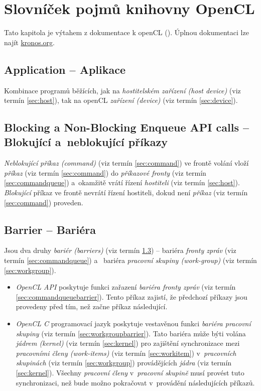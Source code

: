 \chapter{Slovníček pojmů knihovny OpenCL}

Tato kapitola je výtahem z dokumentace k openCL (\cite{opencl}).
Úplnou dokumentaci lze najít \url{kronos.org}.

\section{Application -- Aplikace}
\label{sec:application}

Kombinace programů běžících, jak na \emph{hostitelském zařízení (host device)} (viz termín \ref{sec:host}), tak na openCL \emph{zařízení (device)}  (viz termín \ref{sec:device}).

\section{Blocking a Non-Blocking Enqueue API calls -- Blokující a~neblokující příkazy }
\label{sec:blockunblocapicall}

\emph{Neblokující} \emph{příkaz (command)} (viz termín \ref{sec:command}) ve frontě volání vloží \emph{příkaz} (viz termín \ref{sec:command}) do
\emph{příkazové fronty} (viz termín \ref{sec:commandqueue}) a~okamžitě vrátí řízení \emph{hostiteli} (viz termín \ref{sec:host}). \emph{Blokující}
příkaz ve frontě nevrátí řízení hostiteli, dokud není \emph{příkaz} (viz termín \ref{sec:command}) proveden.

\section{Barrier  -- Bariéra}
\label{sec:barrier}

Jsou dva druhy \emph{bariér (barriers)} (viz termín \ref{sec:barrier}) -- bariéra \emph{fronty zpráv} (viz termín \ref{sec:commandqueue}) a~
bariéra \emph{pracovní skupiny (work-group)} (viz termín \ref{sec:workgroup}). 
\begin{itemize}
\item \emph{OpenCL API} poskytuje
funkci zařazení \emph{bariéra fronty zpráv} (viz termín \ref{sec:commandqueuebarrier}). Tento příkaz zajistí, že
předchozí příkazy jsou provedeny před tím, než začne příkaz následující.
\item \emph{OpenCL C} programovací jazyk poskytuje vestavěnou funkci \emph{bariéra pracovní skupiny} (viz termín \ref{sec:workgroupbarrier}). Tato bariéra může býti volána \emph{jádrem (kernel)} (viz termín \ref{sec:kernel}) pro zajištění
synchronizace mezi \emph{pracovními členy (work-items)} (viz termín \ref{sec:workitem}) v~\emph{pracovních skupinách} (viz termín \ref{sec:workgroup}) provádějících \emph{jádra} (viz termín \ref{sec:kernel}). Všechny \emph{pracovní členy} v~\emph{pracovní skupině}
musí provést tuto synchronizaci, než bude možno pokračovat v~provádění následujících příkazů.
\end{itemize}



